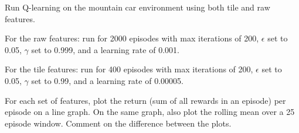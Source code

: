 \documentclass[11pt,addpoints,answers]{exam}
\begin{document}
\begin{questions}
    
    \question[4] Run Q-learning on the mountain car environment using both tile and raw features. 
    
    For the raw features: run for 2000 episodes with max iterations of 200, $\epsilon$ set to 0.05, $\gamma$ set to 0.999, and a learning rate of 0.001. 
    
    For the tile features: run for 400 episodes with max iterations of 200, $\epsilon$ set to 0.05, $\gamma$ set to 0.99, and a learning rate of 0.00005.
    
    For each set of features, plot the return (sum of all rewards in an episode) per episode on a line graph. On the same graph, also plot the rolling mean over a 25 episode window. Comment on the difference between the plots.
    
    \begin{your_solution}[title=Plot of Raw, height=10cm,width=15cm]
    \end{your_solution}
    
    \begin{your_solution}[title=Plot of Tile,height=10cm,width=15cm]
    \end{your_solution}
    

\end{questions}
\end{document}
